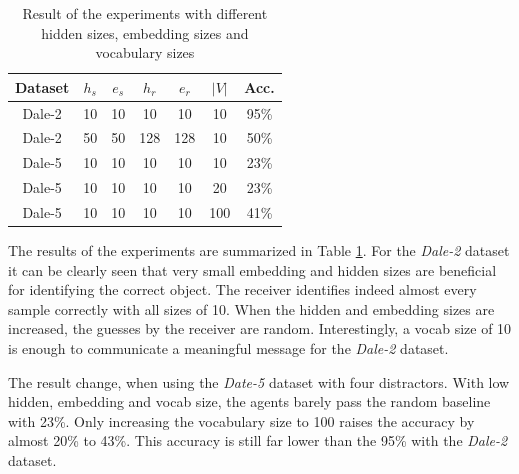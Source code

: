 \documentclass[11pt]{article}
\begin{document}
\begin{table}
  \centering
  \begin{tabular}{c|ccccc|c}
    \hline
    \textbf{Dataset} & $h_{s}$ & $e_{s}$ & $h_{r}$ & $e_{r}$ & $|V|$ & \textbf{Acc.} \\
    \hline
    Dale-2           & {10}    & {10}    & {10}    & {10}    & {10}  & {95\%}        \\
    Dale-2           & {50}    & {50}    & {128}   & {128}   & {10}  & {50\%}        \\
    Dale-5           & {10}    & {10}    & {10}    & {10}    & {10}  & {23\%}        \\
    Dale-5           & {10}    & {10}    & {10}    & {10}    & {20}  & {23\%}        \\
    Dale-5           & {10}    & {10}    & {10}    & {10}    & {100} & {41\%}        \\
    \hline
  \end{tabular}
  \caption{Result of the experiments with different hidden sizes, embedding sizes and vocabulary sizes}
  \label{tab:results}
\end{table}

The results of the experiments are summarized in Table \ref{tab:results}.
For the \emph{Dale-2} dataset it can be clearly seen that very small embedding and hidden sizes are beneficial for identifying the correct object.
The receiver identifies indeed almost every sample correctly with all sizes of 10.
When the hidden and embedding sizes are increased, the guesses by the receiver are random.
Interestingly, a vocab size of 10 is enough to communicate a meaningful message for the \emph{Dale-2} dataset.


The result change, when using the \emph{Date-5} dataset with four distractors.
With low hidden, embedding and vocab size, the agents barely pass the random baseline with 23\%.
Only increasing the vocabulary size to 100 raises the accuracy by almost 20\% to 43\%.
This accuracy is still far lower than the 95\% with the \emph{Dale-2} dataset.


\end{document}
